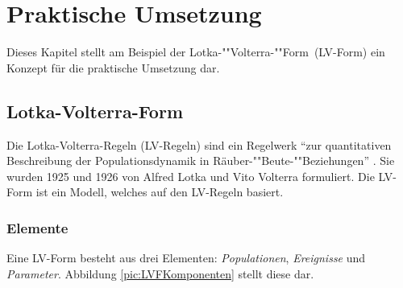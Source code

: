 \chapter{Praktische Umsetzung}\label{chp:Umsetzung}
Dieses Kapitel stellt am Beispiel der Lotka-""Volterra-""Form~(LV-Form) ein Konzept 
für die praktische Umsetzung dar.

\section{Lotka-Volterra-Form}
Die Lotka-Volterra-Regeln (LV-Regeln) sind ein Regelwerk "`zur quantitativen Beschreibung 
der Populationsdynamik in Räuber-""Beute-""Beziehungen"' \cite{wikiD:LVR}. Sie wurden 
1925 und 1926 von Alfred Lotka und Vito Volterra formuliert. Die LV-Form ist ein Modell, 
welches auf den LV-Regeln basiert. 

\subsection{Elemente}
Eine LV-Form besteht aus drei Elementen: \emph{Populationen}, \emph{Ereignisse} 
und \emph{Parameter}. Abbildung \ref{pic:LVFKomponenten} stellt diese dar.


